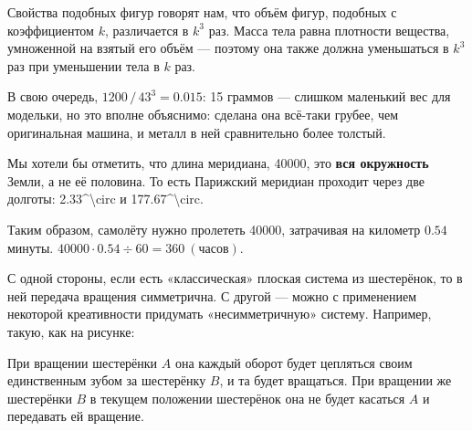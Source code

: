 \begin{itemize}
\itA Свойства подобных фигур говорят нам, что объём фигур, подобных с коэффициентом $k$, различается в $k^3$ раз. Масса тела равна плотности вещества, умноженной на взятый его объём — поэтому она также должна уменьшаться в $k^3$ раз при уменьшении тела в $k$ раз.

В свою очередь, $1200\,/\,43^3 = 0.015$: 15 граммов — слишком маленький вес для модельки, но это вполне объяснимо: сделана она всё-таки грубее, чем оригинальная машина, и металл в ней сравнительно более толстый.

\itB Мы хотели бы отметить, что длина меридиана, \SI{40000}{}, это {\bfseries вся окружность} Земли, а не её половина. То есть Парижский меридиан проходит через две долготы: \SI{2.33^\circ}{} и \SI{177.67^\circ}{}.

Таким образом, самолёту нужно пролететь \SI{40000}{}, затрачивая на километр $0.54$ минуты. $40000 \cdot 0.54 \div 60 = \SI{360}{(\text{часов})}$.

\itC С одной стороны, если есть «классическая» плоская система из шестерёнок, то в ней передача вращения симметрична. С другой — можно с применением некоторой креативности придумать «несимметричную» систему. Например, такую, как на рисунке:

\begin{center}

\end{center}

При вращении шестерёнки $A$ она каждый оборот будет цепляться своим единственным зубом за шестерёнку $B$, и та будет вращаться. При вращении же шестерёнки $B$ в текущем положении шестерёнок она не будет касаться $A$ и передавать ей вращение.

\end{itemize}